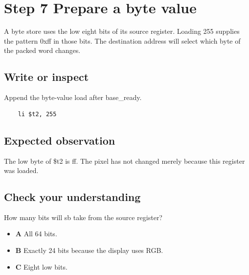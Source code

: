 \section{Step 7 Prepare a byte
  value}\label{002-single-pixel-s07-step-7-prepare-a-byte-value}

A byte store uses the low eight bits of its source register. Loading 255
supplies the pattern 0xff in those bits. The destination address will
select which byte of the packed word changes.

\subsection{Write or
  inspect}\label{002-single-pixel-s07-write-or-inspect}

Append the byte-value load after base\_ready.

\begin{verbatim}
    li $t2, 255
\end{verbatim}

\subsection{Expected
  observation}\label{002-single-pixel-s07-expected-observation}

The low byte of \$t2 is ff. The pixel has not changed merely because
this register was loaded.

\subsection{Check your
  understanding}\label{002-single-pixel-s07-check-your-understanding}

How many bits will sb take from the source register?

\begin{itemize}
  \tightlist
  \item
        \textbf{A} All 64 bits.
  \item
        \textbf{B} Exactly 24 bits because the display uses RGB.
  \item
        \textbf{C} Eight low bits.
\end{itemize}
